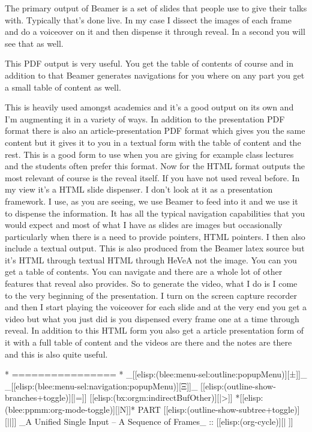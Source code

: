 \begin{whenOrg}
\begin{frame}[fragile,plain,label=outputFormsWalkthrough]
{The primary output of Beamer is a set of slides that people use to give their talks with.
Typically that's done live. In my case I dissect the images of each frame and do a voiceover on it
and then dispense it through reveal. In a second you will see that as well.

This PDF output is very useful. You get the table of contents of course and in addition to that
Beamer generates navigations for you where on any part you get a small table of content
as well.

This is heavily used amongst academics and it's a good output on its own and I'm augmenting
it in a variety of ways. In addition to the presentation PDF format there is also an
article-presentation PDF format which gives you the same content but it gives it to you in
a textual form with the table of content and the rest. This is a good form to use when you are giving
for example class lectures and the students often prefer this format.
Now for the HTML format outputs the most relevant of course is the reveal itself. If you have not used reveal
before. In my view it's a HTML slide dispenser. I don't look at it as a presentation framework.
I use, as you are seeing, we use Beamer to feed into it and we use it to dispense the information.
It has all the typical navigation capabilities that you would expect and most of
what I have as slides are images but occasionally particularly when there is a need to provide
pointers, HTML pointers. I then also include a textual output. This is also produced from the Beamer
latex source but it's HTML through textual HTML through HeVeA not the image.
You can you get a table of contents. You can navigate and there are a whole lot of other features
that reveal also provides. So to generate the video, what I do is I come to the very beginning of
the presentation. I turn on the screen capture recorder and then I start playing the voiceover for each
slide and at the very end you get a video but what you just did is you dispensed every frame
one at a time through reveal. In addition to this HTML form you also get a article presentation form of it
with a full table of content and the videos are there and the notes are there and this is also quite useful.


}

\end{frame}


\begin{whenOrg}
*      ================
*  _[[elisp:(blee:menu-sel:outline:popupMenu)][±]]_ _[[elisp:(blee:menu-sel:navigation:popupMenu)][Ξ]]_ [[elisp:(outline-show-branches+toggle)][|=]] [[elisp:(bx:orgm:indirectBufOther)][|>]] *[[elisp:(blee:ppmm:org-mode-toggle)][|N]]*  PART       [[elisp:(outline-show-subtree+toggle)][||]]   _A Unified Single Input -- A Sequence of Frames_ ::  [[elisp:(org-cycle)][| ]]
\end{whenOrg}


\end{whenOrg}

